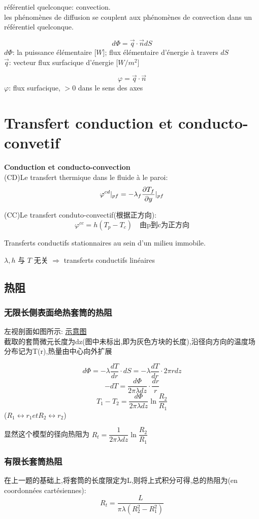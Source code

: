 \documentclass{article}
\begin{document}
r\'ef\'erentiel quelconque: convection.\\
les ph\'enom\`enes de diffusion se couplent aux ph\'enom\`enes de convection dans un r\'ef\'erentiel quelconque.

\bigskip
$$ d\Phi = \vec{q} \cdot \vec{n} dS $$
$d\Phi$: la puissance \'el\'ementaire [$W$]; flux \'el\'ementaire d'\'energie \`a travers $dS$\\
$\vec{q}$: vecteur flux surfacique d'\'energie [$W/m^2$]

$$\varphi = \vec{q} \cdot \vec{n}$$
$\varphi$: flux surfacique, $>0$ dans le sens des axes

\section{Transfert conduction et conducto-convetif}
\textbf{Conduction et conducto-convection}\\
(CD)Le transfert thermique dans le fluide \`a le paroi:
$$\varphi^{cd} |_{pf} = -\\\lambda _f \frac{\partial T_f}{\partial y}|_{pf}$$

(CC)Le transfert conduto-convectif(根据正方向):
$$\varphi ^{cc}=h(T_p - T_c) \quad \text{由p到c为正方向}$$

Transferts conductifs stationnaires au sein d'un milieu immobile.

$\lambda, h$ 与 $T$ 无关 $\Rightarrow$ transferts conductifs lin\'eaires
\subsection{热阻}
\subsubsection{无限长侧表面绝热套筒的热阻}
左视剖面如图所示:
\href{http://i.imgbox.com/X9xXlBML.png}{示意图}\\
截取的套筒微元长度为dz(图中未标出,即为灰色方块的长度),沿径向方向的温度场分布记为T(r),热量由中心向外扩展

$$
d\Phi = -\lambda \dfrac{dT}{dr}\cdot dS = -\lambda \dfrac{dT}{dr} \cdot 2\pi rdz
$$
$$-dT = \dfrac{d\Phi}{2\pi \lambda dz} \cdot \dfrac{dr}{r}$$
$$ T_1 - T_2 = \dfrac{d\Phi}{2\pi \lambda dz} \ln{\dfrac{R_2}{R_1}} $$
($R_1 \leftrightarrow r_1 et R_2 \leftrightarrow r_2$)

显然这个模型的径向热阻为 $R_t = \dfrac{1}{2\pi \lambda dz} \ln{\dfrac{R_2}{R_1}}$

\subsubsection{有限长套筒热阻}
在上一题的基础上,将套筒的长度限定为L,则将上式积分可得,总的热阻为(en coordonn\'ees cart\'esiennes):
$$ R_t = \dfrac{L}{\pi \lambda(R_2^2 - R_1^2)} $$
\end{document}
